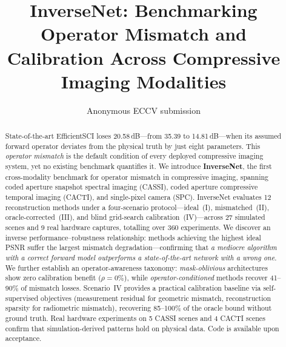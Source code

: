 \documentclass[runningheads]{llncs}
\begin{document}
\title{InverseNet: Benchmarking Operator Mismatch and Calibration Across Compressive Imaging Modalities}

\author{Anonymous ECCV submission}

\maketitle

\begin{abstract}
State-of-the-art EfficientSCI loses 20.58\,dB---from 35.39 to 14.81\,dB---when its assumed forward operator deviates from the physical truth by just eight parameters.
This \emph{operator mismatch} is the default condition of every deployed compressive imaging system, yet no existing benchmark quantifies it.
We introduce \textbf{InverseNet}, the first cross-modality benchmark for operator mismatch in compressive imaging, spanning coded aperture snapshot spectral imaging (CASSI), coded aperture compressive temporal imaging (CACTI), and single-pixel camera (SPC).
InverseNet evaluates 12 reconstruction methods under a four-scenario protocol---ideal~(I), mismatched~(II), oracle-corrected~(III), and blind grid-search calibration~(IV)---across 27 simulated scenes and 9 real hardware captures, totalling over 360 experiments.
We discover an inverse performance--robustness relationship: methods achieving the highest ideal PSNR suffer the largest mismatch degradation---confirming that \emph{a mediocre algorithm with a correct forward model outperforms a state-of-the-art network with a wrong one}.
We further establish an operator-awareness taxonomy: \emph{mask-oblivious} architectures show zero calibration benefit ($\rho = 0\%$), while \emph{operator-conditioned} methods recover 41--90\% of mismatch losses.
Scenario~IV provides a practical calibration baseline via self-supervised objectives (measurement residual for geometric mismatch, reconstruction sparsity for radiometric mismatch), recovering 85--100\% of the oracle bound without ground truth.
Real hardware experiments on 5 CASSI scenes and 4 CACTI scenes confirm that simulation-derived patterns hold on physical data.
Code is available upon acceptance.

\end{abstract}
\end{document}
